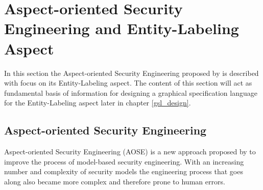 \documentclass[twoside, openright, 12pt]{book}
\begin{document}







\section{Aspect-oriented Security Engineering and Entity-Labeling Aspect}
\label{AOSEEL}
In this section the Aspect-oriented Security Engineering proposed by \cite{Amthor18} is described with focus on its Entity-Labeling aspect.
The content of this section will act as fundamental basis of information for designing a graphical specification language for the Entity-Labeling aspect later in chapter \ref{gsl_design}.


\subsection{Aspect-oriented Security Engineering}
\label{AOSE}
Aspect-oriented Security Engineering (AOSE) is a new approach proposed by \cite{Amthor18} to improve the process of model-based security engineering.
With an increasing number and complexity of security models the engineering process that goes along also became more complex and therefore prone to human errors.
\end{document}
